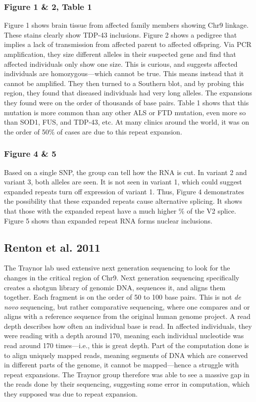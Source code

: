 \subsubsection*{Figure 1 \& 2, Table 1}

Figure 1 shows brain tissue from affected family members showing Chr9 linkage. These stains clearly show TDP-43 inclusions. Figure 2 shows a pedigree that implies a lack of transmission from affected parent to affected offspring. Via PCR amplification, they size different alleles in their suspected gene and find that affected individuals only show one size. This is curious, and suggests affected individuals are homozygous---which cannot be true. This means instead that it cannot be amplified. They then turned to a Southern blot, and by probing this region, they found that diseased individuals had very long alleles. The expansions they found were on the order of thousands of base pairs. Table 1 shows that this mutation is more common than any other ALS or FTD mutation, even more so than SOD1, FUS, and TDP-43, etc. At many clinics around the world, it was on the order of 50\% of cases are due to this repeat expansion. 

\subsubsection*{Figure 4 \& 5}

Based on a single SNP, the group can tell how the RNA is cut. In variant 2 and variant 3, both alleles are seen. It is not seen in variant 1, which could suggest expanded repeats turn off expression of variant 1. Thus, Figure 4 demonstrates the possibility that these expanded repeats cause alternative splicing. It shows that those with the expanded repeat have a much higher \% of the V2 splice. Figure 5 shows than expanded repeat RNA forms nuclear inclusions. 

\subsection*{Renton et al. 2011}

The Traynor lab used extensive next generation sequencing to look for the changes in the critical region of Chr9. Next generation sequencing specifically creates a shotgun library of genomic DNA, sequences it, and aligns them together. Each fragment is on the order of 50 to 100 base pairs. This is not \textit{de novo} sequencing, but rather comparative sequencing, where one compares and or aligns with a reference sequence from the original human genome project. A read depth describes how often an individual base is read. In affected individuals, they were reading with a depth around 170, meaning each individual nucleotide was read around 170 times---i.e., this is great depth. Part of the computation done is to align uniquely mapped reads, meaning segments of DNA which are conserved in different parts of the genome, it cannot be mapped---hence a struggle with repeat expansions. The Traynor group therefore was able to see a massive gap in the reads done by their sequencing, suggesting some error in computation, which they supposed was due to repeat expansion.\newline

